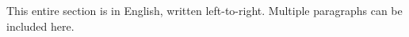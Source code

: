 \documentclass[12pt, a4paper]{article}
\begin{document}


\begin{english}
This entire section is in English, written left-to-right.
Multiple paragraphs can be included here.
\end{english}

\end{document}
